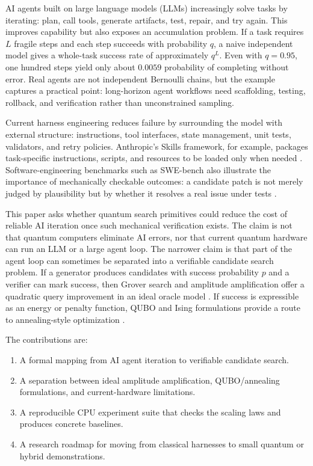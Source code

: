 \documentclass[11pt]{article}
\begin{document}
AI agents built on large language models (LLMs) increasingly solve tasks by iterating: plan, call tools, generate artifacts, test, repair, and try again. This improves capability but also exposes an accumulation problem. If a task requires $L$ fragile steps and each step succeeds with probability $q$, a naive independent model gives a whole-task success rate of approximately $q^L$. Even with $q=0.95$, one hundred steps yield only about $0.0059$ probability of completing without error. Real agents are not independent Bernoulli chains, but the example captures a practical point: long-horizon agent workflows need scaffolding, testing, rollback, and verification rather than unconstrained sampling.

Current harness engineering reduces failure by surrounding the model with external structure: instructions, tool interfaces, state management, unit tests, validators, and retry policies. Anthropic's Skills framework, for example, packages task-specific instructions, scripts, and resources to be loaded only when needed \cite{anthropicSkills}. Software-engineering benchmarks such as SWE-bench also illustrate the importance of mechanically checkable outcomes: a candidate patch is not merely judged by plausibility but by whether it resolves a real issue under tests \cite{jimenez2023swebench,openaiSWEVerified,deng2025swebenchpro}.

This paper asks whether quantum search primitives could reduce the cost of reliable AI iteration once such mechanical verification exists. The claim is not that quantum computers eliminate AI errors, nor that current quantum hardware can run an LLM or a large agent loop. The narrower claim is that part of the agent loop can sometimes be separated into a verifiable candidate search problem. If a generator produces candidates with success probability $p$ and a verifier can mark success, then Grover search and amplitude amplification offer a quadratic query improvement in an ideal oracle model \cite{grover1996fast,brassard2002amplitude}. If success is expressible as an energy or penalty function, QUBO and Ising formulations provide a route to annealing-style optimization \cite{lucas2014ising,dwaveDocsQubo,dwaveDocsAnnealing}.

The contributions are:
\begin{enumerate}
  \item A formal mapping from AI agent iteration to verifiable candidate search.
  \item A separation between ideal amplitude amplification, QUBO/annealing formulations, and current-hardware limitations.
  \item A reproducible CPU experiment suite that checks the scaling laws and produces concrete baselines.
  \item A research roadmap for moving from classical harnesses to small quantum or hybrid demonstrations.
\end{enumerate}
\end{document}
